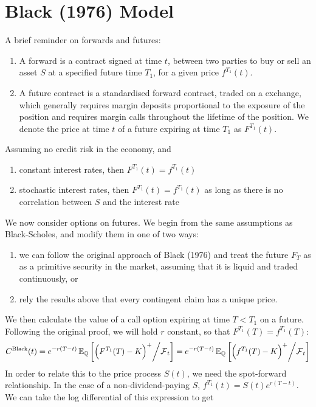 \documentclass[11pt]{article}
\begin{document}
\section{Black (1976) Model}

\begin{remark}
A brief reminder on forwards and futures:
\begin{enumerate}
\item A forward is a contract signed at time $t$, between two parties to buy or sell an asset $S$ at a specified future time ${T_1}$, for a given price $f^{T_1}(t)$.
\item A future contract is a standardised forward contract, traded on a exchange, which generally requires margin deposits proportional to the exposure of the position and requires margin calls throughout the lifetime of the position. We denote the price at time $t$ of a future expiring at time $T_1$ as $F^{T_1}(t)$.
\end{enumerate}
\end{remark}
\begin{theorem} Assuming no credit risk in the economy, and
\begin{enumerate}
\item constant interest rates, then $F^{T_1}(t) = f^{T_1}(t)$
\item stochastic interest rates, then $F^{T_1}(t) = f^{T_1}(t)$ as long as there is no correlation between $S$ and the interest rate
\end{enumerate}
\end{theorem}
We now consider options on futures. We begin from the same assumptions as Black-Scholes, and modify them in one of two ways:
\begin{enumerate}
\item we can follow the original approach of Black (1976) and treat the future $F_T$ as as a primitive security in the market, assuming that it is liquid and traded continuously, or
\item rely the results above that every contingent claim has a unique price.
\end{enumerate}
We then calculate the value of a call option expiring at time $T < {T_1}$ on a future. Following the original proof, we will hold $r$ constant, so that $F^{T_1}(T) = f^{T_1}(T)$:
$$C^{\text{Black}}(t) = e^{-r(T-t)}\operatorname{\mathbb E}_{\operatorname{\mathbb Q}}\left[ \left(F^{T_1}(T)-K\right)^+ \middle/ \operatorname{\mathcal F}_t \right] = e^{-r(T-t)}\operatorname{\mathbb E}_{\operatorname{\mathbb Q}}\left[ \left(f^{T_1}(T)-K\right)^+ \middle/ \operatorname{\mathcal F}_t \right]$$
In order to relate this to the price process $S(t)$, we need the spot-forward relationship. In the case of a non-dividend-paying $S$, $f^{T_1}(t) = S(t)e^{r(T-t)}$. We can take the log differential of this expression to get
\end{document}
